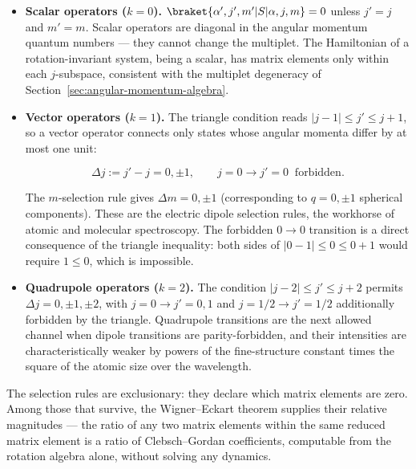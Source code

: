 \begin{itemize}
\item \textbf{Scalar operators ($k=0$).} $\braket{\alpha',j',m'|S|\alpha,j,m} = 0$ unless $j'=j$ and $m'=m$. Scalar operators are diagonal in the angular momentum quantum numbers --- they cannot change the multiplet. The Hamiltonian of a rotation-invariant system, being a scalar, has matrix elements only within each $j$-subspace, consistent with the multiplet degeneracy of Section~\ref{sec:angular-momentum-algebra}.
\item \textbf{Vector operators ($k=1$).} The triangle condition reads $|j-1| \le j' \le j+1$, so a vector operator connects only states whose angular momenta differ by at most one unit:
\begin{linenomath}
\begin{equation*}
\Delta j := j' - j = 0,\pm 1, \qquad
j = 0 \to j' = 0 \;\; \text{forbidden}.
\end{equation*}
\end{linenomath}
The $m$-selection rule gives $\Delta m = 0,\pm1$ (corresponding to $q = 0,\pm1$ spherical components). These are the electric dipole selection rules, the workhorse of atomic and molecular spectroscopy. The forbidden $0\to0$ transition is a direct consequence of the triangle inequality: both sides of $|0-1|\le 0\le 0+1$ would require $1\le 0$, which is impossible.
\item \textbf{Quadrupole operators ($k=2$).} The condition $|j-2|\le j'\le j+2$ permits $\Delta j = 0,\pm1,\pm2$, with $j=0\to j'=0,1$ and $j=1/2\to j'=1/2$ additionally forbidden by the triangle. Quadrupole transitions are the next allowed channel when dipole transitions are parity-forbidden, and their intensities are characteristically weaker by powers of the fine-structure constant times the square of the atomic size over the wavelength.
\end{itemize}

The selection rules are exclusionary: they declare which matrix elements are zero. Among those that survive, the Wigner--Eckart theorem supplies their relative magnitudes --- the ratio of any two matrix elements within the same reduced matrix element is a ratio of Clebsch--Gordan coefficients, computable from the rotation algebra alone, without solving any dynamics.

